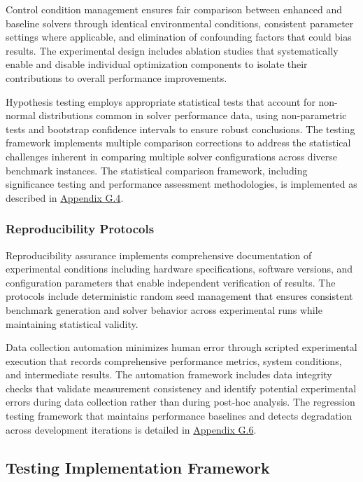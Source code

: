 Control condition management ensures fair comparison between enhanced and baseline solvers through identical environmental conditions, consistent parameter settings where applicable, and elimination of confounding factors that could bias results. The experimental design includes ablation studies that systematically enable and disable individual optimization components to isolate their contributions to overall performance improvements.

Hypothesis testing employs appropriate statistical tests that account for non-normal distributions common in solver performance data, using non-parametric tests and bootstrap confidence intervals to ensure robust conclusions. The testing framework implements multiple comparison corrections to address the statistical challenges inherent in comparing multiple solver configurations across diverse benchmark instances. The statistical comparison framework, including significance testing and performance assessment methodologies, is implemented as described in \hyperref[appendix:statistical-analysis]{Appendix G.4}.

\subsubsection{Reproducibility Protocols}
Reproducibility assurance implements comprehensive documentation of experimental conditions including hardware specifications, software versions, and configuration parameters that enable independent verification of results. The protocols include deterministic random seed management that ensures consistent benchmark generation and solver behavior across experimental runs while maintaining statistical validity.

Data collection automation minimizes human error through scripted experimental execution that records comprehensive performance metrics, system conditions, and intermediate results. The automation framework includes data integrity checks that validate measurement consistency and identify potential experimental errors during data collection rather than during post-hoc analysis. The regression testing framework that maintains performance baselines and detects degradation across development iterations is detailed in \hyperref[appendix:regression-testing]{Appendix G.6}.

\subsection{Testing Implementation Framework}

